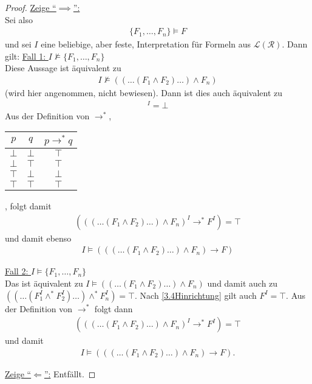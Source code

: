 \begin{proof}
	\underline{Zeige ``$\implies$'':}\\
	Sei also 
	\begin{align}\label{3.4Hinrichtung}
		\lbrace F_1,\ldots, F_n\rbrace\models F
	\end{align}
	und sei $I$ eine beliebige, aber feste, Interpretation für Formeln aus $\mathcal{L}(\mathcal{R})$. 
	Dann gilt:\nl
	\underline{Fall 1: $I\not\models\lbrace F_1,\ldots,F_n\rbrace$}\\
	Diese Aussage ist äquivalent zu
	\begin{align*}
		I\not\models((\ldots(F_1\wedge F_2)\ldots)\wedge F_n)
	\end{align*}
	(wird hier angenommen, nicht bewiesen). 
	Dann ist dies auch äquivalent zu 
	\begin{align*}
		[((\ldots(F_1\wedge F_2)\ldots)\wedge F_n)]^I=\bot
	\end{align*}
	Aus der Definition von $\to^\ast$,\\
	\begin{tabular}{c|c||c}
		$p$ & $q$ & $p\to^\ast q$\\ \hline
		$\bot$ & $\bot$ & $\top$\\
		$\bot$ & $\top$ & $\top$\\
		$\top$ & $\bot$ & $\bot$\\
		$\top$ & $\top$ & $\top$
	\end{tabular}, 
	folgt damit
	\begin{align*}
		(((\ldots(F_1\wedge F_2)\ldots)\wedge F_n)^I\to^\ast F^I)=\top
	\end{align*}
	und damit ebenso
	\begin{align*}
		I\models(((\ldots(F_1\wedge F_2)\ldots)\wedge F_n)\to F)
	\end{align*}

	\underline{Fall 2: $I\models\lbrace F_1,\ldots,F_n\rbrace$}\\
	Das ist äquivalent zu $I\models((\ldots(F_1\wedge F_2)\ldots)\wedge F_n)$ und damit auch zu $((\ldots (F_1^I\wedge^\ast F_2^I)\ldots)\wedge^\ast F_n^I)=\top$. 
	Nach \eqref{3.4Hinrichtung} gilt auch $F^I=\top$. 
	Aus der Definition von $\to^\ast$ folgt dann 
	\begin{align*}
		(((\ldots(F_1\wedge F_2)\ldots)\wedge F_n)^I\to^\ast F^I)=\top
	\end{align*}
	und damit
	\begin{align*}
		I\models(((\ldots(F_1\wedge F_2)\ldots)\wedge F_n)\to F).
	\end{align*}

	\underline{Zeige ``$\Longleftarrow$'':} Entfällt.
\end{proof}
